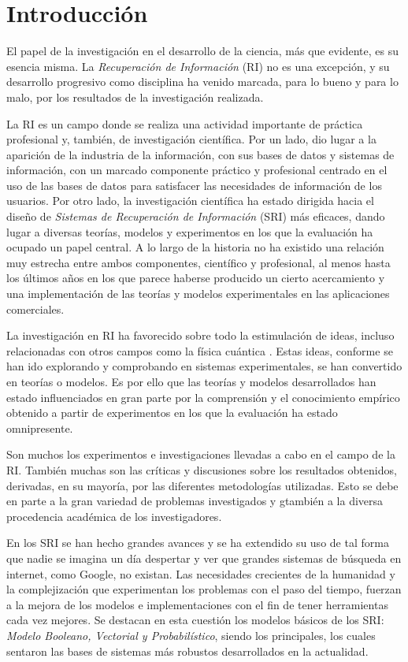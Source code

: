 \section{Introducción}\label{sec:intro}

El papel de la investigación en el desarrollo de la ciencia, más que evidente,
es su esencia misma. La \emph{Recuperación de Información} (RI)
no es una excepción, y su desarrollo progresivo como disciplina ha venido
marcada, para lo bueno y para lo malo, por los resultados de la investigación
realizada.\cite{chowdhury}

La RI es un campo donde se realiza una actividad importante de práctica
profesional y, también, de investigación científica. Por un lado, dio lugar a
la aparición de la industria de la información, con sus bases de datos y
sistemas de información, con un marcado componente práctico y profesional
centrado en el uso de las bases de datos para satisfacer las necesidades de
información de los usuarios. Por otro lado, la investigación científica ha
estado dirigida hacia el diseño de \emph{Sistemas de Recuperación de
Información} (SRI) más eficaces, dando lugar a diversas teorías, modelos y
experimentos en los que la evaluación ha ocupado un papel central. A lo largo
de la historia no ha existido una relación muy estrecha entre ambos
componentes, científico y profesional, al menos hasta los últimos años en los
que parece haberse producido un cierto acercamiento y una implementación de
las teorías y modelos experimentales en las aplicaciones comerciales.
\cite{ceri}

La investigación en RI ha favorecido sobre todo la estimulación de ideas, incluso
relacionadas con otros campos como la física cuántica \cite{piwowarski}. Estas
ideas, conforme se han ido explorando y comprobando en sistemas experimentales,
se han convertido en teorías o modelos. Es por ello que las teorías y
modelos desarrollados han estado influenciados en gran parte por la comprensión
y el conocimiento empírico obtenido a partir de experimentos en los que la
evaluación ha estado omnipresente.

Son muchos los experimentos e investigaciones llevadas a cabo en el campo de la
RI. También muchas son las críticas y discusiones sobre los resultados
obtenidos, derivadas, en su mayoría, por las diferentes metodologías
utilizadas. Esto se debe en parte a la gran variedad de problemas investigados
y gtambién a la diversa procedencia académica de los investigadores.
\cite{ellis}

En los SRI se han hecho grandes avances y se ha extendido su uso
de tal forma que nadie se imagina un día despertar y ver que grandes sistemas
de búsqueda en internet, como Google, no existan. Las necesidades crecientes
de la humanidad y la complejización que experimentan los problemas con el paso
del tiempo, fuerzan a la mejora de los modelos e implementaciones con el fin
de tener herramientas cada vez mejores. Se destacan en esta cuestión los
modelos básicos de los SRI: \emph{Modelo Booleano, Vectorial y Probabilístico},
siendo los principales, los cuales sentaron las bases de sistemas más robustos
desarrollados en la actualidad.


